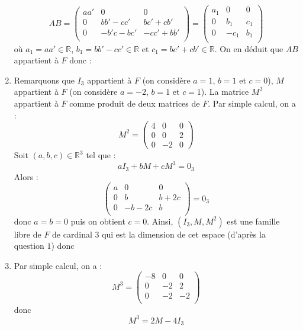 \documentclass[a4paper,twoside,french,10pt]{VcCours}
\begin{document}
\begin{enumerate}
    $$ AB =\begin{pmatrix}
    aa' & 0 & 0 \\
    0 & bb'-cc' & bc'+cb' \\
    0 & -b'c-bc' & -cc'+bb' \\
    \end{pmatrix} = \begin{pmatrix}
    a_1 & 0 & 0 \\
    0 & b_1& c_1 \\
    0 & -c_1 & b_1 \\
    \end{pmatrix}$$
    où $a_1=aa' \in \mathbb{R}$, $b_1=bb'-cc' \in \mathbb{R}$ et $c_1 = bc'+cb' \in \mathbb{R}$. On en déduit que $AB$ appartient à $F$ donc :
    \item Remarquons que $I_3$ appartient à $F$ (on considère $a=1$, $b=1$ et $c=0$), $M$ appartient à $F$ (on considère $a=-2$, $b=1$ et $c=1$). La matrice $M^2$ appartient à $F$ comme produit de deux matrices de $F$. Par simple calcul, on a :
    $$ M^2 = \begin{pmatrix}
    4 & 0 & 0 \\
    0 & 0 & 2 \\
    0 & -2 & 0 
    \end{pmatrix}$$
    Soit $(a,b,c) \in \mathbb{R}^3$ tel que :
    $$ a I_3 + bM + cM^3 = 0_3$$
    Alors :
    $$ \begin{pmatrix}
    a & 0 & 0 \\
    0 & b &b+2c \\
    0 &-b-2c &b \\
    \end{pmatrix} = 0_3$$
    donc $a=b=0$ puis on obtient $c=0$. Ainsi, $(I_3,M,M^2)$ est une famille libre de $F$ de cardinal $3$ qui est la dimension de cet espace (d'après la question $1$) donc 
    \item Par simple calcul, on a :
    $$ M^3 = \begin{pmatrix}
    -8 & 0 & 0 \\
    0 & -2 & 2 \\
    0 & -2 & -2 \\
    \end{pmatrix}$$
    donc 
    $$ \boxed{M^3 = 2M -4I_3}$$
    \end{enumerate}
\end{document}
